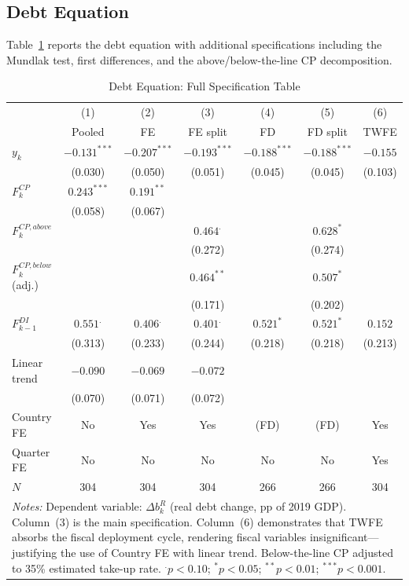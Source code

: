 \documentclass[12pt, a4paper]{article}
\begin{document}
\subsection{Debt Equation}

Table~\ref{tab:debt_full} reports the debt equation with additional specifications including the Mundlak test, first differences, and the above/below-the-line CP decomposition.

\begin{table}[htbp]
\centering
\caption{Debt Equation: Full Specification Table}
\label{tab:debt_full}
\small
\begin{tabular}{lcccccc}
\toprule
 & (1) & (2) & (3) & (4) & (5) & (6) \\
 & Pooled & FE & FE split & FD & FD split & TWFE \\
\midrule
$y_k$
  & $-0.131^{***}$ & $-0.207^{***}$ & $-0.193^{***}$ & $-0.188^{***}$ & $-0.188^{***}$ & $-0.155$ \\
  & (0.030)        & (0.050)        & (0.051)        & (0.045)        & (0.045)        & (0.103) \\[3pt]
$F_k^{CP}$
  & $0.243^{***}$ & $0.191^{**}$ &  &  &  &  \\
  & (0.058)       & (0.067)      &  &  &  &  \\[3pt]
$F_k^{CP,above}$
  &  &  & $0.464^{.}$ &  & $0.628^{*}$ &  \\
  &  &  & (0.272)     &  & (0.274)     &  \\[3pt]
$F_k^{CP,below}$ (adj.)
  &  &  & $0.464^{**}$ &  & $0.507^{*}$ &  \\
  &  &  & (0.171)      &  & (0.202)     &  \\[3pt]
$F_{k-1}^{DI}$
  & $0.551^{.}$ & $0.406^{.}$ & $0.401^{.}$ & $0.521^{*}$ & $0.521^{*}$ & $0.152$ \\
  & (0.313)     & (0.233)     & (0.244)     & (0.218)     & (0.218)     & (0.213) \\[3pt]
Linear trend
  & $-0.090$ & $-0.069$ & $-0.072$ &  &  &  \\
  & (0.070)  & (0.071)  & (0.072)  &  &  &  \\[3pt]
\midrule
Country FE & No & Yes & Yes & (FD) & (FD) & Yes \\
Quarter FE & No & No  & No  & No   & No   & Yes \\
$N$        & 304 & 304 & 304 & 266 & 266 & 304 \\
\bottomrule
\multicolumn{7}{p{14cm}}{\footnotesize \textit{Notes:} Dependent variable: $\Delta b_k^R$ (real debt change, pp of 2019 GDP). Column~(3) is the main specification. Column~(6) demonstrates that TWFE absorbs the fiscal deployment cycle, rendering fiscal variables insignificant---justifying the use of Country FE with linear trend. Below-the-line CP adjusted to 35\% estimated take-up rate. $^{.}p<0.10$; $^{*}p<0.05$; $^{**}p<0.01$; $^{***}p<0.001$.} \\
\end{tabular}
\end{table}
\end{document}
